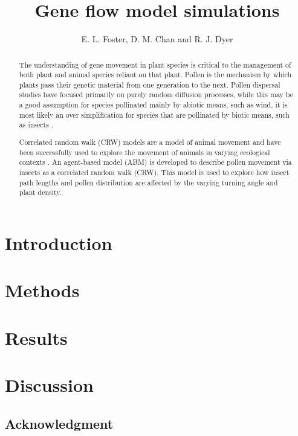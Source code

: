 \documentclass{article}
\title{Gene flow model simulations}
\author{E. L. Foster, D. M. Chan and R. J. Dyer }
\begin{document}
\maketitle

\begin{abstract} 
  The understanding of gene movement in plant species is critical to the management
  of both plant and animal species reliant on that plant.  Pollen is the mechanism by which plants
  pass their genetic material from one generation to the next. Pollen dispersal studies have focused
  primarily on purely random diffusion processes, while this may be a good assumption for species
  pollinated mainly by abiotic means, such as wind, it is most likely an over simplification for
  species that are pollinated by biotic means, such as insects \cite{Chan}.

  Correlated random walk (CRW) models are a model of animal movement \cite{Prasad05} and have been
  successfully used to explore the movement of animals in varying ecological contexts
  \cite{Bartumeus07}. An agent-based model (ABM) is developed to describe pollen movement via insects
  as a correlated random walk (CRW). This model is used to explore how insect path lengths and pollen
  distribution are affected by the varying turning angle and plant density.  
\end{abstract}

\section{Introduction}
  
\section{Methods}
  
\section{Results}
  
\section{Discussion}
  
\subsection*{Acknowledgment}


\end{document}
